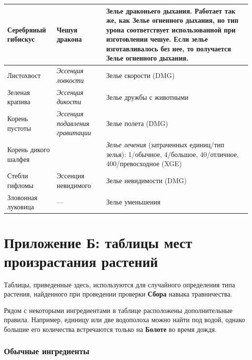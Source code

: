 \documentclass[a4paper, 9pt, twocolumn]{book}
\begin{document}
	\begin{tabular}{|m{3cm}|m{4cm}|m{10cm}|}
		\hline
		Серебряный гибискус & Чешуя дракона & Зелье драконьего дыхания. Работает так же, как \textbf{Зелье огненного дыхания}, но тип урона соответствует использованной при изготовлении чешуе. Если зелье изготавливалось без нее, то получается \textbf{Зелье огненного дыхания}.  \\
		\hline
		Листохвост & \textit{Эссенция ловкости} & Зелье скорости (DMG) \\
		\hline
		Зеленая крапива & \textit{Эссенция дикости} & Зелье дружбы с животными \\
		\hline
		Корень пустоты & \textit{Эссенция подавления гравитации} & Зелье полета (DMG) \\
		\hline
		Корень дикого шалфея &  & \textit{Зелье лечения} (затраченных единиц/тип зелья): 1/обычное, 4/большое, 40/отличное, 400/превосходное (XGE) \\ %
		\hline
		Стебли гифломы & Эссенция невидимого & Зелье невидимости (DMG) \\
		\hline
		Зловонная луковица & --- & Зелье уменьшения \\
		\hline
	\end{tabular}


	\chapter{Приложение Б: таблицы мест произрастания растений} %
	
	Таблицы, приведенные здесь, используются для случайного определения типа растения, найденного при проведении проверки \textbf{Сбора} навыка травничества.
	
	Рядом с некоторыми ингредиентами в таблице расположены дополнительные правила. Например, единицу или две водополоха можно найти под водой, однако большие его количества встречаются только на \textbf{Болоте} во время дождя.
	
	\subsection{Обычные ингредиенты}
	
\end{document}
